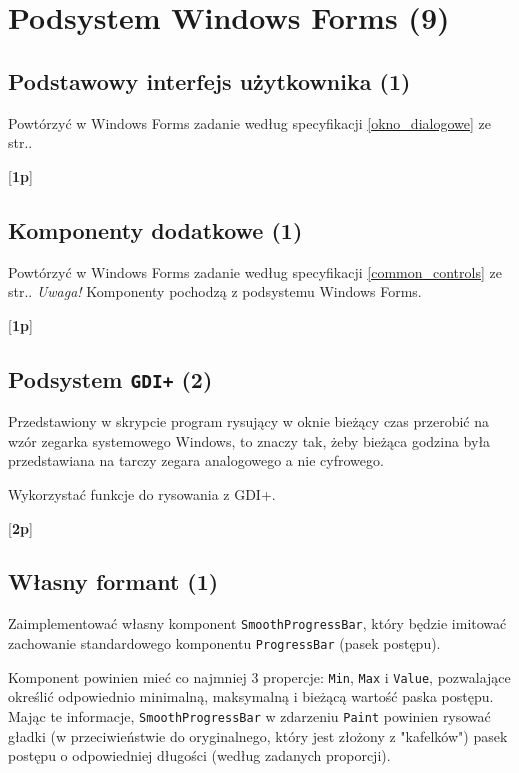 ﻿\section{Podsystem Windows Forms (9)}

\subsection{Podstawowy interfejs użytkownika (1)} 

    Powtórzyć w Windows Forms zadanie według specyfikacji \ref{okno_dialogowe} ze str.\pageref{okno_dialogowe}.

      [{\bf 1p}]  
	
\subsection{Komponenty dodatkowe (1)} 

    Powtórzyć w Windows Forms zadanie według specyfikacji \ref{common_controls} ze str.\pageref{common_controls}.
	{\em Uwaga!} Komponenty pochodzą z podsystemu Windows Forms.

      [{\bf 1p}]  
	
\subsection{Podsystem {\tt GDI+} (2)} 
    Przedstawiony w skrypcie program rysujący w oknie bieżący czas przerobić na wzór zegarka systemowego
\label{podsystem_gdi}	
      Windows, to znaczy tak, żeby bieżąca godzina była przedstawiana na tarczy zegara analogowego a nie cyfrowego.
      
      Wykorzystać funkcje do rysowania z GDI+. 

      [{\bf 2p}]  
      
\subsection{Własny formant (1)}
      
      Zaimplementować własny komponent {\tt SmoothProgressBar}, który
\label{smooth_progress}	  
      będzie imitować zachowanie standardowego komponentu {\tt ProgressBar} (pasek postępu).
      
      Komponent powinien mieć co najmniej 3 propercje: {\tt Min}, {\tt Max} i {\tt Value}, 
      pozwalające określić odpowiednio minimalną, maksymalną i bieżącą wartość paska postępu.      
      Mając te informacje, {\tt SmoothProgressBar} w zdarzeniu {\tt Paint} powinien rysować gładki 
      (w przeciwieństwie do oryginalnego, który jest złożony z "kafelków")
      pasek postępu o odpowiedniej długości (według zadanych proporcji). 
      
